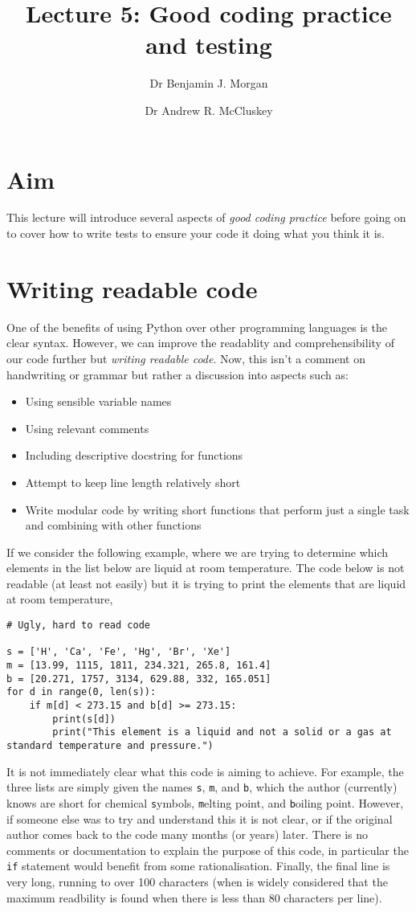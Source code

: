 \documentclass[a4paper]{article}
\title{Lecture 5: Good coding practice and testing}
\author[1]{Dr Benjamin J. Morgan}
\author[1,2]{Dr Andrew R. McCluskey}
\affil[1]{Department of Chemistry, University of Bath, email: b.j.morgan@bath.ac.uk}
\affil[2]{Diamond Light Source, email: andrew.mccluskey@diamond.ac.uk}
\begin{document}
\maketitle

\section*{Aim}
This lecture will introduce several aspects of \emph{good coding practice} before going on to cover how to write tests to ensure your code it doing what you think it is.

\section{Writing readable code}
One of the benefits of using Python over other programming languages is the clear syntax.
However, we can improve the readablity and comprehensibility of our code further but \emph{writing readable code}.
Now, this isn't a comment on handwriting or grammar but rather a discussion into aspects such as:
\begin{itemize}
  \item{Using sensible variable names}
  \item{Using relevant comments}
  \item{Including descriptive docstring for functions}
  \item{Attempt to keep line length relatively short}
  \item{Write modular code by writing short functions that perform just a single task and combining with other functions}
\end{itemize}
If we consider the following example, where we are trying to determine which elements in the list below are liquid at room temperature.
The code below is not readable (at least not easily) but it is trying to print the elements that are liquid at room temperature,
\begin{lstlisting}
# Ugly, hard to read code

s = ['H', 'Ca', 'Fe', 'Hg', 'Br', 'Xe']
m = [13.99, 1115, 1811, 234.321, 265.8, 161.4]
b = [20.271, 1757, 3134, 629.88, 332, 165.051]
for d in range(0, len(s)):
    if m[d] < 273.15 and b[d] >= 273.15:
        print(s[d])
        print("This element is a liquid and not a solid or a gas at standard temperature and pressure.")
\end{lstlisting}
It is not immediately clear what this code is aiming to achieve.
For example, the three lists are simply given the names \texttt{s}, \texttt{m}, and \texttt{b}, which the author (currently) knows are short for chemical \texttt{s}ymbols, \texttt{m}elting point, and \texttt{b}oiling point.
However, if someone else was to try and understand this it is not clear, or if the original author comes back to the code many months (or years) later.
There is no comments or documentation to explain the purpose of this code, in particular the \texttt{if} statement would benefit from some rationalisation.
Finally, the final line is very long, running to over 100 characters (when is widely considered that the maximum readbility is found when there is less than 80 characters per line).
\end{document}
